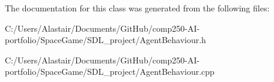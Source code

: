 The documentation for this class was generated from the following files\+:\begin{DoxyCompactItemize}
\item 
C\+:/\+Users/\+Alastair/\+Documents/\+Git\+Hub/comp250-\/\+A\+I-\/portfolio/\+Space\+Game/\+S\+D\+L\+\_\+project/Agent\+Behaviour.\+h\item 
C\+:/\+Users/\+Alastair/\+Documents/\+Git\+Hub/comp250-\/\+A\+I-\/portfolio/\+Space\+Game/\+S\+D\+L\+\_\+project/Agent\+Behaviour.\+cpp\end{DoxyCompactItemize}
